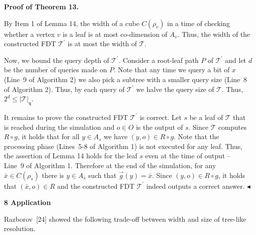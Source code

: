 \par\medskip\noindent\textbf{Proof of Theorem 13.}\par




By Item 1 of Lemma 14, the width of a cube $C(\rho_{v})$ in a time of checking whether a vertex $v$ is a leaf is at most co-dimension of $A_{v}$.
Thus, the width of the constructed FDT $\mathcal{T}^{\prime}$ is at most the width of $\mathcal{T}$.\par




Now, we bound the query depth of $\mathcal{T}^{\prime}$.
Consider a root-leaf path $P$ of $\mathcal{T}^{\prime}$ and let $d$ be the number of queries made on $P$.
Note that any time we query a bit of $x$ (Line 9 of Algorithm 2) we also pick a subtree with a smaller query size (Line 8 of Algorithm 2).
Thus, by each query of $\mathcal{T}^{\prime}$ we halve the query size of $\mathcal{T}$.
Thus, $2^{d}\leq|\mathcal{T}|_{\mathsf{q}}$.\par




It remains to prove the constructed FDT $\mathcal{T}^{\prime}$ is correct.
Let $s$ be a leaf of $\mathcal{T}$ that is reached during the simulation and $o\in O$ is the output of $s$.
Since $\mathcal{T}$ computes $R\circ g$, it holds that for all $y\in A_{s}$ we have $(y,o)\in R\circ g$.
Note that the processing phase (Lines 5-8 of Algorithm 1) is not executed for any leaf.
Thus, the assertion of Lemma 14 holds for the leaf $s$ even at the time of output – Line 9 of Algorithm 1.
Therefore at the end of the simulation, for any $\bar{x}\in C(\rho_{s})$ there is $y\in A_{s}$ such that $\overrightarrow{g}(y)=\bar{x}$.
Since $(y,o)\in R\circ g$, it holds that $(\bar{x},o)\in R$ and the constructed FDT $\mathcal{T}^{\prime}$ indeed outputs a correct answer.
$\blacktriangleleft$\par







\par\medskip\noindent\textbf{
8 Application}\par




Razborov [24] showed the following trade-off between width and size of tree-like resolution.\par





